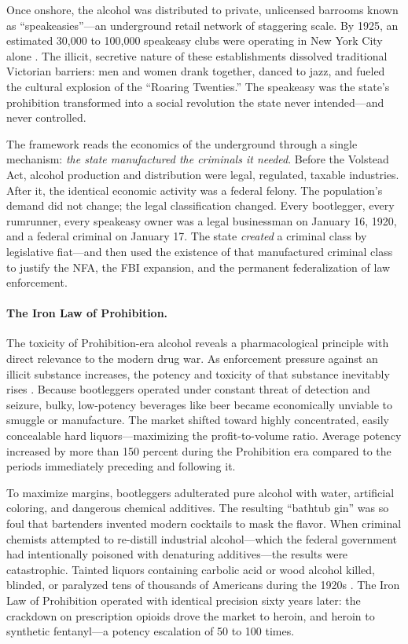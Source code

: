 Once onshore, the alcohol was distributed to private, unlicensed barrooms known as ``speakeasies''---an underground retail network of staggering scale. By 1925, an estimated 30,000 to 100,000 speakeasy clubs were operating in New York City alone \cite{mobmuseum_speakeasies}. The illicit, secretive nature of these establishments dissolved traditional Victorian barriers: men and women drank together, danced to jazz, and fueled the cultural explosion of the ``Roaring Twenties.'' The speakeasy was the state's prohibition transformed into a social revolution the state never intended---and never controlled.

The framework reads the economics of the underground through a single mechanism: \textit{the state manufactured the criminals it needed}. Before the Volstead Act, alcohol production and distribution were legal, regulated, taxable industries. After it, the identical economic activity was a federal felony. The population's demand did not change; the legal classification changed. Every bootlegger, every rumrunner, every speakeasy owner was a legal businessman on January 16, 1920, and a federal criminal on January 17. The state \textit{created} a criminal class by legislative fiat---and then used the existence of that manufactured criminal class to justify the NFA, the FBI expansion, and the permanent federalization of law enforcement.

\paragraph{The Iron Law of Prohibition.}
The toxicity of Prohibition-era alcohol reveals a pharmacological principle with direct relevance to the modern drug war. As enforcement pressure against an illicit substance increases, the potency and toxicity of that substance inevitably rises \cite{cato_prohibition}. Because bootleggers operated under constant threat of detection and seizure, bulky, low-potency beverages like beer became economically unviable to smuggle or manufacture. The market shifted toward highly concentrated, easily concealable hard liquors---maximizing the profit-to-volume ratio. Average potency increased by more than 150 percent during the Prohibition era compared to the periods immediately preceding and following it.

To maximize margins, bootleggers adulterated pure alcohol with water, artificial coloring, and dangerous chemical additives. The resulting ``bathtub gin'' was so foul that bartenders invented modern cocktails to mask the flavor. When criminal chemists attempted to re-distill industrial alcohol---which the federal government had intentionally poisoned with denaturing additives---the results were catastrophic. Tainted liquors containing carbolic acid or wood alcohol killed, blinded, or paralyzed tens of thousands of Americans during the 1920s \cite{mobmuseum_bathtub}. The Iron Law of Prohibition operated with identical precision sixty years later: the crackdown on prescription opioids drove the market to heroin, and heroin to synthetic fentanyl---a potency escalation of 50 to 100 times.

